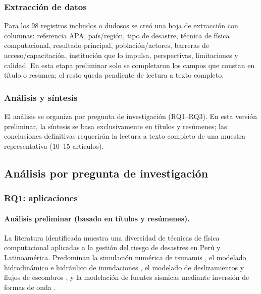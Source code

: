 \documentclass[12pt,a4paper]{article}
\begin{document}
\subsubsection{Extracción de datos}
Para los 98 registros incluidos o dudosos se creó una hoja de extracción con columnas: referencia APA, país/región, tipo de desastre, técnica de física computacional, resultado principal, población/actores, barreras de acceso/capacitación, institución que lo impulsa, perspectivas, limitaciones y calidad. En esta etapa preliminar solo se completaron los campos que constan en título o resumen; el resto queda pendiente de lectura a texto completo.

\subsubsection{Análisis y síntesis}
El análisis se organiza por pregunta de investigación (RQ1--RQ3). En esta versión preliminar, la síntesis se basa exclusivamente en títulos y resúmenes; las conclusiones definitivas requerirán la lectura a texto completo de una muestra representativa (10--15 artículos).

\subsection{Análisis por pregunta de investigación}
\subsubsection{RQ1: aplicaciones}
\label{sec:rq1}
\paragraph*{Análisis preliminar (basado en títulos y resúmenes).}
La literatura identificada muestra una diversidad de técnicas de física computacional aplicadas a la gestión del riesgo de desastres en Perú y Latinoamérica. Predominan la simulación numérica de tsunamis \parencite{jimnez2023numerical, androsov2024nonlinear, davila2025probabilistic, garcia2025parallel}, el modelado hidrodinámico e hidráulico de inundaciones \parencite{fagundes2021sediment, fleischmann2021regional, escobarsilva2023assessing, saavedra2026impact}, el modelado de deslizamientos y flujos de escombros \parencite{marin2021assessing, ochoacornejo2025rock, meyrat2024simulating, flores2026numerical}, y la modelación de fuentes sísmicas mediante inversión de formas de onda \parencite{jimnez2021seismic, jimnez2021seismic2, moreno2025tsunami, jimenez2024numerical, jimenez2025numerical, jimnez2023seismic, jimnez2023seismic, jiang2023estimation}. 
\end{document}
